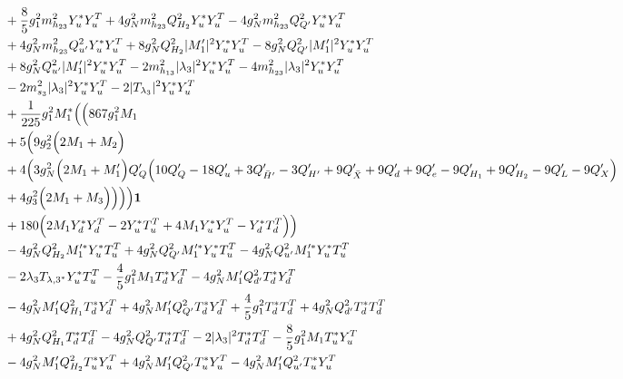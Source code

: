 {\begin{align}
 &+\frac{8}{5} g_{1}^{2} m_{h_{23}}^2 {Y_u^*  Y_{u}^{T}} +4 g_{N}^{2} m_{h_{23}}^2 Q_{H_2}^{2} {Y_u^*  Y_{u}^{T}} -4 g_{N}^{2} m_{h_{23}}^2 Q_{Q'}^{2} {Y_u^*  Y_{u}^{T}} \nonumber \\ 
 &+4 g_{N}^{2} m_{h_{23}}^2 Q_{u'}^{2} {Y_u^*  Y_{u}^{T}} +8 g_{N}^{2} Q_{H_2}^{2} |M_1'|^2 {Y_u^*  Y_{u}^{T}} -8 g_{N}^{2} Q_{Q'}^{2} |M_1'|^2 {Y_u^*  Y_{u}^{T}} \nonumber \\ 
 &+8 g_{N}^{2} Q_{u'}^{2} |M_1'|^2 {Y_u^*  Y_{u}^{T}} -2 m_{h_{13}}^2 |\lambda_3|^2 {Y_u^*  Y_{u}^{T}} -4 m_{h_{23}}^2 |\lambda_3|^2 {Y_u^*  Y_{u}^{T}} \nonumber \\ 
 &-2 m_{s_3}^2 |\lambda_3|^2 {Y_u^*  Y_{u}^{T}} -2 |T_{\lambda_3}|^2 {Y_u^*  Y_{u}^{T}} \nonumber \\ 
 &+\frac{1}{225} g_{1}^{2} M_1^* \Big(\Big(867 g_{1}^{2} M_1 \nonumber \\ 
 &+5 \Big(9 g_{2}^{2} \Big(2 M_1  + M_2\Big)\nonumber \\ 
 &+4 \Big(3 g_{N}^{2} \Big(2 M_1  + M_1'\Big)Q_Q' \Big(10 Q_Q'  -18 Q_u'  + 3 Q_{\bar{H}'}'  -3 Q_{H'}'  + 9 Q_{\bar{X}}'  + 9 Q_d'  + 9 Q_e'  -9 Q_{H_1}'  + 9 Q_{H_2}'  -9 Q_L'  -9 Q_X' \Big)\nonumber\\
& + 4 g_{3}^{2} \Big(2 M_1  + M_3\Big)\Big)\Big)\Big){\bf 1} \nonumber \\ 
 &+180 \Big(2 M_1 {Y_d^*  Y_{d}^{T}}  -2 {Y_u^*  T_{u}^{T}}  + 4 M_1 {Y_u^*  Y_{u}^{T}}  - {Y_d^*  T_{d}^{T}} \Big)\Big)\nonumber \\ 
 &-4 g_{N}^{2} Q_{H_2}^{2} M_1'^* {Y_u^*  T_{u}^{T}} +4 g_{N}^{2} Q_{Q'}^{2} M_1'^* {Y_u^*  T_{u}^{T}} -4 g_{N}^{2} Q_{u'}^{2} M_1'^* {Y_u^*  T_{u}^{T}} \nonumber \\ 
 &-2 \lambda_3 T_{{\lambda,3}^*} {Y_u^*  T_{u}^{T}} -\frac{4}{5} g_{1}^{2} M_1 {T_d^*  Y_{d}^{T}} -4 g_{N}^{2} M_1' Q_{d'}^{2} {T_d^*  Y_{d}^{T}} \nonumber \\ 
 &-4 g_{N}^{2} M_1' Q_{H_1}^{2} {T_d^*  Y_{d}^{T}} +4 g_{N}^{2} M_1' Q_{Q'}^{2} {T_d^*  Y_{d}^{T}} +\frac{4}{5} g_{1}^{2} {T_d^*  T_{d}^{T}} +4 g_{N}^{2} Q_{d'}^{2} {T_d^*  T_{d}^{T}} \nonumber \\ 
 &+4 g_{N}^{2} Q_{H_1}^{2} {T_d^*  T_{d}^{T}} -4 g_{N}^{2} Q_{Q'}^{2} {T_d^*  T_{d}^{T}} -2 |\lambda_3|^2 {T_d^*  T_{d}^{T}} -\frac{8}{5} g_{1}^{2} M_1 {T_u^*  Y_{u}^{T}} \nonumber \\ 
 &-4 g_{N}^{2} M_1' Q_{H_2}^{2} {T_u^*  Y_{u}^{T}} +4 g_{N}^{2} M_1' Q_{Q'}^{2} {T_u^*  Y_{u}^{T}} -4 g_{N}^{2} M_1' Q_{u'}^{2} {T_u^*  Y_{u}^{T}} \nonumber \\ 

\end{align}}
